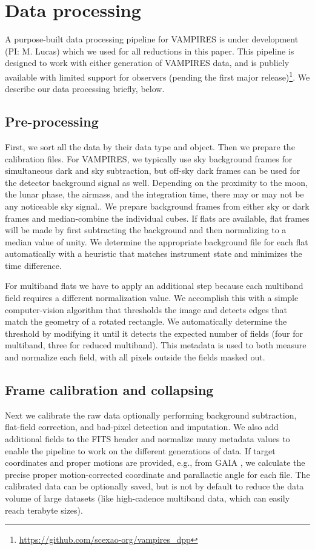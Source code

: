 \section{Data processing}\label{sec:processing}

A purpose-built data processing pipeline for VAMPIRES is under development (PI: M. Lucas) which we used for all reductions in this paper. This pipeline is designed to work with either generation of VAMPIRES data, and is publicly available with limited support for observers (pending the first major release)\footnote{\url{https://github.com/scexao-org/vampires_dpp}}. We describe our data processing briefly, below.

\subsection{Pre-processing}
First, we sort all the data by their data type and object. Then we prepare the calibration files. For VAMPIRES, we typically use sky background frames for simultaneous dark and sky subtraction, but off-sky dark frames can be used for the detector background signal as well. Depending on the proximity to the moon, the lunar phase, the airmass, and the integration time, there may or may not be any noticeable sky signal.. We prepare background frames from either sky or dark frames and median-combine the individual cubes. If flats are available, flat frames will be made by first subtracting the background and then normalizing to a median value of unity. We determine the appropriate background file for each flat automatically with a heuristic that matches instrument state and minimizes the time difference.

For multiband flats we have to apply an additional step because each multiband field requires a different normalization value. We accomplish this with a simple computer-vision algorithm that thresholds the image and detects edges that match the geometry of a rotated rectangle. We automatically determine the threshold by modifying it until it detects the expected number of fields (four for multiband, three for reduced multiband). This metadata is used to both measure and normalize each field, with all pixels outside the fields masked out.

\subsection{Frame calibration and collapsing}
Next we calibrate the raw data optionally performing background subtraction, flat-field correction, and bad-pixel detection and imputation. We also add additional fields to the FITS header and normalize many metadata values to enable the pipeline to work on the different generations of data. If target coordinates and proper motions are provided, e.g., from GAIA \citep{gaia_collaboration_gaia_2016,gaia_collaboration_gaia_2018,gaia_collaboration_gaia_2021}, we calculate the precise proper motion-corrected coordinate and parallactic angle for each file. The calibrated data can be optionally saved, but is not by default to reduce the data volume of large datasets (like high-cadence multiband data, which can easily reach terabyte sizes).

